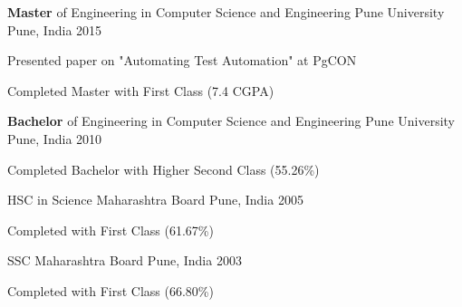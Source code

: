 

\begin{cventries}

  \cventry
    {\textbf{Master} of Engineering in Computer Science and Engineering} %
    {Pune University} %
    {Pune, India} %
    {2015} %
    {
      \begin{cvitems} %
        \item {Presented paper on "Automating Test Automation" at PgCON}
		\item {Completed Master with First Class (7.4 CGPA)}
      \end{cvitems}
    }
	\cventry
    {\textbf{Bachelor} of Engineering in Computer Science and Engineering} %
    {Pune University} %
    {Pune, India} %
    {2010} %
    {
      \begin{cvitems} %
        \item {Completed Bachelor with Higher Second Class (55.26\%)}
      \end{cvitems}
    }
	\cventry
    {HSC in Science} %
    {Maharashtra Board} %
    {Pune, India} %
    {2005} %
    {
      \begin{cvitems} %
        \item {Completed with First Class (61.67\%)}
      \end{cvitems}
    }
	\cventry
    {SSC} %
    {Maharashtra Board} %
    {Pune, India} %
    {2003} %
    {
      \begin{cvitems} %
        \item {Completed with First Class (66.80\%)}
      \end{cvitems}
    }
\end{cventries}
